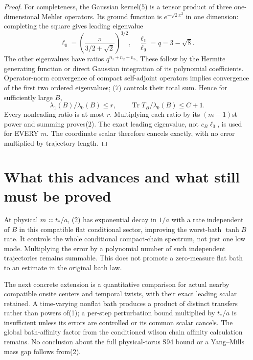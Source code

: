 \documentclass{article}
\begin{document}
\begin{proof}
For completeness, the Gaussian kernel(5) is a tensor product of three one-dimensional Mehler operators. Its ground function is $e^{-\sqrt2 x^2}$ in one dimension: completing the square gives leading eigenvalue
\[
 \ell_0=\left(\frac\pi{3/2+\sqrt2}\right)^{3/2},
 \quad \frac{\ell_1}{\ell_0}=q=3-\sqrt8.             \tag{8}
\]
The other eigenvalues have ratios $q^{n_1+n_2+n_3}$. These follow by the Hermite generating function or direct Gaussian integration of its polynomial coefficients. Operator-norm convergence of compact self-adjoint operators implies convergence of the first two ordered eigenvalues; (7) controls their total sum. Hence for sufficiently large $B$,
\[
 \lambda_1(B)/\lambda_0(B)\le r,\qquad
 \operatorname{Tr}T_B/\lambda_0(B)\le C+1.            \tag{9}
\]
Every nonleading ratio is at most $r$. Multiplying each ratio by its $(m-1)$st power and summing proves(2). The exact leading eigenvalue, not $c_B\ell_0$, is used for EVERY $m$. The coordinate scalar therefore cancels exactly, with no error multiplied by trajectory length.
\end{proof}

\section*{What this advances and what still must be proved}
At physical $m\asymp t_*/a$, (2) has exponential decay in $1/a$ with a rate independent of $B$ in this compatible flat conditional sector, improving the worst-bath $\tanh B$ rate. It controls the whole conditional compact-chain spectrum, not just one low mode. Multiplying the error by a polynomial number of such independent trajectories remains summable. This does not promote a zero-measure flat bath to an estimate in the original bath law.

The next concrete extension is a quantitative comparison for actual nearby compatible onsite centers and temporal twists, with their exact leading scalar retained. A time-varying nonflat bath produces a product of distinct transfers rather than powers of(1); a per-step perturbation bound multiplied by $t_*/a$ is insufficient unless its errors are controlled or its common scalar cancels. The global bath-affinity factor from the conditioned wilson chain affinity calculation remains. No conclusion about the full physical-torus S94 bound or a Yang--Mills mass gap follows from(2).
\end{document}
